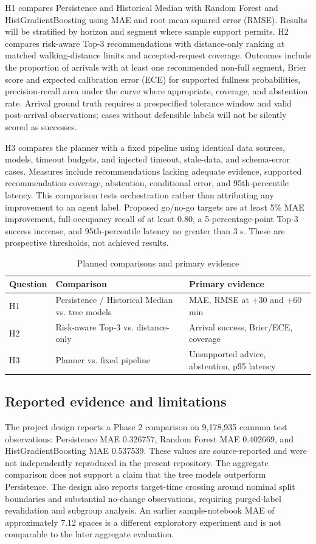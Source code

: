 \documentclass[conference,letterpaper,10pt]{IEEEtran}
\begin{document}
H1 compares Persistence and Historical Median with Random Forest and HistGradientBoosting using MAE and root mean squared error (RMSE). Results will be stratified by horizon and segment where sample support permits. H2 compares risk-aware Top-3 recommendations with distance-only ranking at matched walking-distance limits and accepted-request coverage. Outcomes include the proportion of arrivals with at least one recommended non-full segment, Brier score and expected calibration error (ECE) for supported fullness probabilities, precision-recall area under the curve where appropriate, coverage, and abstention rate. Arrival ground truth requires a prespecified tolerance window and valid post-arrival observations; cases without defensible labels will not be silently scored as successes.

H3 compares the planner with a fixed pipeline using identical data sources, models, timeout budgets, and injected timeout, stale-data, and schema-error cases. Measures include recommendations lacking adequate evidence, supported recommendation coverage, abstention, conditional error, and 95th-percentile latency. This comparison tests orchestration rather than attributing any improvement to an agent label. Proposed go/no-go targets are at least 5\% MAE improvement, full-occupancy recall of at least 0.80, a 5-percentage-point Top-3 success increase, and 95th-percentile latency no greater than 3 s. These are prospective thresholds, not achieved results.

\begin{table}[t]
\caption{Planned comparisons and primary evidence}
\label{tab:planned}
\centering
\footnotesize
\begin{tabular}{p{}p{}p{}}
\toprule
Question & Comparison & Primary evidence \\
\midrule
H1 & Persistence / Historical Median vs. tree models & MAE, RMSE at +30 and +60 min \\
H2 & Risk-aware Top-3 vs. distance-only & Arrival success, Brier/ECE, coverage \\
H3 & Planner vs. fixed pipeline & Unsupported advice, abstention, p95 latency \\
\bottomrule
\end{tabular}
\end{table}

\subsection{Reported evidence and limitations}
The project design reports a Phase 2 comparison on 9,178,935 common test observations: Persistence MAE 0.326757, Random Forest MAE 0.402669, and HistGradientBoosting MAE 0.537539. These values are source-reported and were not independently reproduced in the present repository. The aggregate comparison does not support a claim that the tree models outperform Persistence. The design also reports target-time crossing around nominal split boundaries and substantial no-change observations, requiring purged-label revalidation and subgroup analysis. An earlier sample-notebook MAE of approximately 7.12 spaces is a different exploratory experiment and is not comparable to the later aggregate evaluation.
\end{document}
